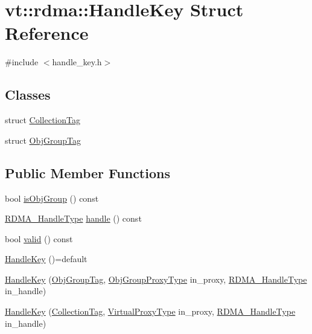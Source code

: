 \hypertarget{structvt_1_1rdma_1_1_handle_key}{}\section{vt\+:\+:rdma\+:\+:Handle\+Key Struct Reference}
\label{structvt_1_1rdma_1_1_handle_key}


{\ttfamily \#include $<$handle\+\_\+key.\+h$>$}

\subsection*{Classes}
\begin{DoxyCompactItemize}
\item 
struct \hyperlink{structvt_1_1rdma_1_1_handle_key_1_1_collection_tag}{Collection\+Tag}
\item 
struct \hyperlink{structvt_1_1rdma_1_1_handle_key_1_1_obj_group_tag}{Obj\+Group\+Tag}
\end{DoxyCompactItemize}
\subsection*{Public Member Functions}
\begin{DoxyCompactItemize}
\item 
bool \hyperlink{structvt_1_1rdma_1_1_handle_key_a22f6eb0a9075cf1e52b7660816b7fbdf}{is\+Obj\+Group} () const
\item 
\hyperlink{namespacevt_a10442579ec4e7ebef223818e64bcf908}{R\+D\+M\+A\+\_\+\+Handle\+Type} \hyperlink{structvt_1_1rdma_1_1_handle_key_a242f0565b49f78b3574ff2a5dda04b83}{handle} () const
\item 
bool \hyperlink{structvt_1_1rdma_1_1_handle_key_af14c7f2ccbc5129259dc642c14bdc792}{valid} () const
\item 
\hyperlink{structvt_1_1rdma_1_1_handle_key_ac6ce62340f11f9e63f16297366952fec}{Handle\+Key} ()=default
\item 
\hyperlink{structvt_1_1rdma_1_1_handle_key_a73ee0c4261ec7b7e007cb8da8b2ff86f}{Handle\+Key} (\hyperlink{structvt_1_1rdma_1_1_handle_key_1_1_obj_group_tag}{Obj\+Group\+Tag}, \hyperlink{namespacevt_ad7cae989df485fccca57f0792a880a8e}{Obj\+Group\+Proxy\+Type} in\+\_\+proxy, \hyperlink{namespacevt_a10442579ec4e7ebef223818e64bcf908}{R\+D\+M\+A\+\_\+\+Handle\+Type} in\+\_\+handle)
\item 
\hyperlink{structvt_1_1rdma_1_1_handle_key_a0fe8e2149d12df5aaa6cd7d9da08dd31}{Handle\+Key} (\hyperlink{structvt_1_1rdma_1_1_handle_key_1_1_collection_tag}{Collection\+Tag}, \hyperlink{namespacevt_a1b417dd5d684f045bb58a0ede70045ac}{Virtual\+Proxy\+Type} in\+\_\+proxy, \hyperlink{namespacevt_a10442579ec4e7ebef223818e64bcf908}{R\+D\+M\+A\+\_\+\+Handle\+Type} in\+\_\+handle)
\end{DoxyCompactItemize}
